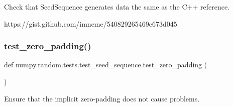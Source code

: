 \begin{DoxyVerb}Check that SeedSequence generates data the same as the C++ reference.

https://gist.github.com/imneme/540829265469e673d045
\end{DoxyVerb}
 \mbox{\label{namespacenumpy_1_1random_1_1tests_1_1test__seed__sequence_a260e04e8b457c2016230df4ed7630a07}} 
\subsubsection{\texorpdfstring{test\+\_\+zero\+\_\+padding()}{test\_zero\_padding()}}
{\footnotesize\ttfamily def numpy.\+random.\+tests.\+test\+\_\+seed\+\_\+sequence.\+test\+\_\+zero\+\_\+padding (\begin{DoxyParamCaption}{ }\end{DoxyParamCaption})}

\begin{DoxyVerb}Ensure that the implicit zero-padding does not cause problems.
\end{DoxyVerb}
 